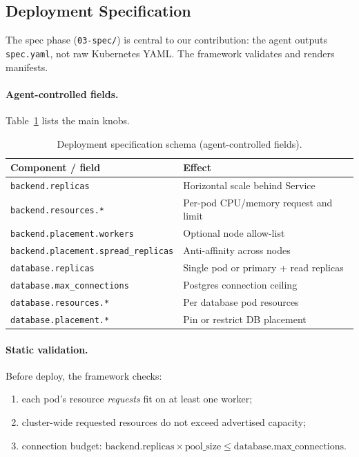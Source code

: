 \subsection{Deployment Specification}
\label{sec:methods-spec}

The spec phase (\texttt{03-spec/}) is central to our contribution: the agent
outputs \texttt{spec.yaml}, not raw Kubernetes YAML.  The framework validates
and renders manifests.

\paragraph{Agent-controlled fields.}
Table~\ref{tab:spec-schema} lists the main knobs.

\begin{table}[t]
  \centering
  \caption{Deployment specification schema (agent-controlled fields).}
  \label{tab:spec-schema}
  \small
  \begin{tabular}{@{}ll@{}}
    \toprule
    \textbf{Component / field} & \textbf{Effect} \\
    \midrule
    \texttt{backend.replicas} & Horizontal scale behind Service \\
    \texttt{backend.resources.*} & Per-pod CPU/memory request and limit \\
    \texttt{backend.placement.workers} & Optional node allow-list \\
    \texttt{backend.placement.spread\_replicas} & Anti-affinity across nodes \\
    \texttt{database.replicas} & Single pod or primary + read replicas \\
    \texttt{database.max\_connections} & Postgres connection ceiling \\
    \texttt{database.resources.*} & Per database pod resources \\
    \texttt{database.placement.*} & Pin or restrict DB placement \\
    \bottomrule
  \end{tabular}
\end{table}

\paragraph{Static validation.}
Before deploy, the framework checks:
\begin{enumerate}
  \item each pod's resource \emph{requests} fit on at least one worker;
  \item cluster-wide requested resources do not exceed advertised capacity;
  \item connection budget:
        $\text{backend.replicas} \times \text{pool\_size} \leq
         \text{database.max\_connections}$.
\end{enumerate}

